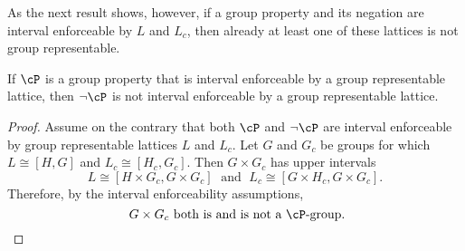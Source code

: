 \begin{frame}[label=IEPropsLemma]{}
As the next result shows, however, if a group property and its
negation are interval enforceable by $L$ and $L_c$, then already
at least one of these lattices is not group representable.
\vskip5mm
\begin{lemma}
  If $\cP$ is a group property that is interval enforceable by a group representable lattice,
  then $\neg \cP$ is not interval enforceable by a group representable lattice.
\end{lemma}
\end{frame}

\begin{frame}[label=IEPropsLemmaProof]{}
\begin{proof}
Assume on the contrary that both $\cP$ and $\neg \cP$
are interval enforceable by group representable lattices $L$ and $L_c$. 
\vskip2mm
Let $G$ and $G_c$ be groups for which $L\cong [H,G]$ and $L_c\cong
[H_c,G_c]$.
\vskip2mm
Then $G\times G_c$ has upper intervals 
\[L\cong [H\times G_c, G\times G_c]\; \text{ and }\;
L_c\cong [G\times H_c, G\times G_c].\]  
Therefore, by the interval enforceability
assumptions, 
\[
\text{ $G\times G_c$ both is and is not a $\cP$-group.}
\] 
\end{proof}
\end{frame}









